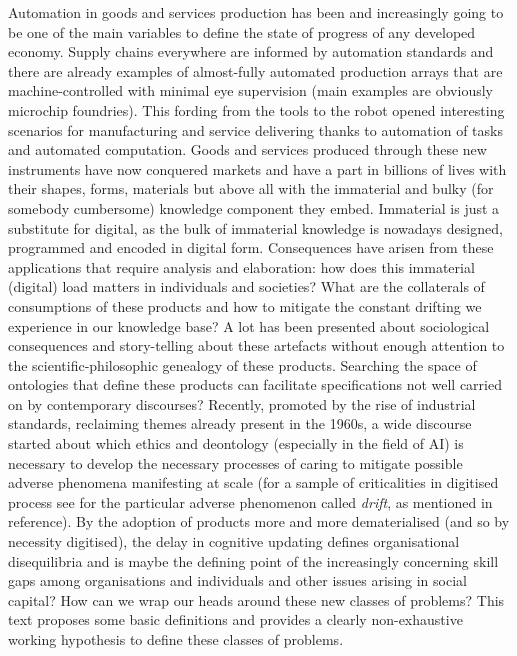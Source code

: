 \documentclass[14pt]{extarticle}
\begin{document}
\hspace*{15mm}Automation in goods and services production has been and increasingly going to be one of the main variables to define the state of progress of any developed economy. Supply chains everywhere are informed by automation standards and there are already examples of almost-fully automated production arrays that are machine-controlled with minimal eye supervision (main examples are obviously microchip foundries). This fording from the tools to the robot opened interesting scenarios for manufacturing and service delivering thanks to automation of tasks and automated computation.
\newline
\hspace*{15mm}Goods and services produced through these new instruments have now conquered markets and have a part in billions of lives with their shapes, forms, materials but above all with the immaterial and bulky (for somebody cumbersome) knowledge component they embed. Immaterial is just a substitute for digital, as the bulk of immaterial knowledge is nowadays designed, programmed and encoded in digital form. Consequences have arisen from these applications that require analysis and elaboration: how does this immaterial (digital) load matters in individuals and societies? What are the collaterals of consumptions of these products and how to mitigate the constant drifting we experience in our knowledge base? A lot has been presented about sociological consequences and story-telling about these artefacts \cite{UMPLEBYcybUSA} without enough attention to the scientific-philosophic genealogy of these products. Searching the space of ontologies that define these products can facilitate specifications not well carried on by contemporary discourses?
\newline
\hspace*{15mm}Recently, promoted by the rise of industrial standards, reclaiming themes already present in the 1960s, a wide discourse started about which ethics and deontology (especially in the field of AI) is necessary to develop the necessary processes of caring to mitigate possible adverse phenomena manifesting at scale (for a sample of criticalities in digitised process see \cite{Pentland2020} for the particular adverse phenomenon called \textit{drift}, as mentioned in reference). By the adoption of products more and more dematerialised (and so by necessity digitised), the delay in cognitive updating defines organisational disequilibria and is maybe the defining point of the increasingly concerning skill gaps among organisations and individuals and other issues arising in social capital? How can we wrap our heads around these new classes of problems? This text proposes some basic definitions and provides a clearly non-exhaustive working hypothesis to define these classes of problems. 
\end{document}
